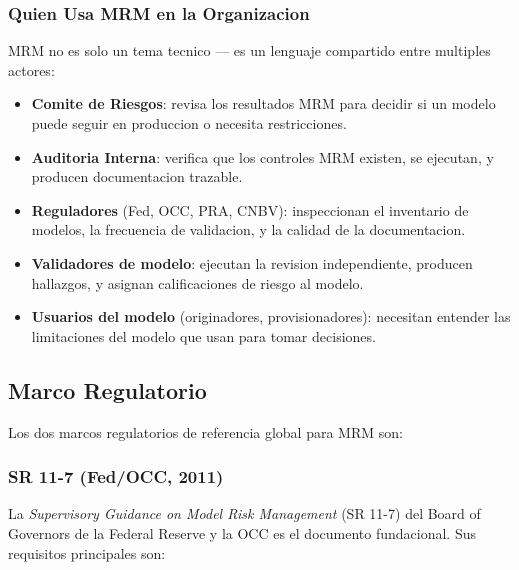 \documentclass[
  spanish,
  11pt,
  letterpaper,
]{scrbook}
\providecommand{\tightlist}{%
  \setlength{\itemsep}{0pt}\setlength{\parskip}{0pt}}
\theoremstyle{plain}
\theoremstyle{remark}
\begin{document}
\subsubsection{Quien Usa MRM en la
Organizacion}\label{quien-usa-mrm-en-la-organizacion}

MRM no es solo un tema tecnico --- es un lenguaje compartido entre
multiples actores:

\begin{itemize}
\tightlist
\item
  \textbf{Comite de Riesgos}: revisa los resultados MRM para decidir si
  un modelo puede seguir en produccion o necesita restricciones.
\item
  \textbf{Auditoria Interna}: verifica que los controles MRM existen, se
  ejecutan, y producen documentacion trazable.
\item
  \textbf{Reguladores} (Fed, OCC, PRA, CNBV): inspeccionan el inventario
  de modelos, la frecuencia de validacion, y la calidad de la
  documentacion.
\item
  \textbf{Validadores de modelo}: ejecutan la revision independiente,
  producen hallazgos, y asignan calificaciones de riesgo al modelo.
\item
  \textbf{Usuarios del modelo} (originadores, provisionadores):
  necesitan entender las limitaciones del modelo que usan para tomar
  decisiones.
\end{itemize}

\subsection{Marco Regulatorio}\label{sec-mrm-regulatory}

Los dos marcos regulatorios de referencia global para MRM son:

\subsubsection{SR 11-7 (Fed/OCC, 2011)}\label{sr-11-7-fedocc-2011}

La \emph{Supervisory Guidance on Model Risk Management} (SR 11-7) del
Board of Governors de la Federal Reserve y la OCC es el documento
fundacional. Sus requisitos principales son:
\end{document}
